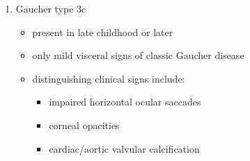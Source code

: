 \documentclass{scrartcl}
\begin{document}
\begin{enumerate}
\begin{enumerate}
\item Gaucher type 3c
\label{sec:org94ae5dc}
\begin{itemize}
\item present in late childhood or later
\item only mild visceral signs of classic Gaucher disease
\item distinguishing clinical signs include:
\begin{itemize}
\item impaired horizontal ocular saccades
\item corneal opacities
\item cardiac/aortic valvular calcification
\end{itemize}
\end{itemize}
\end{enumerate}
\end{enumerate}
\end{document}
